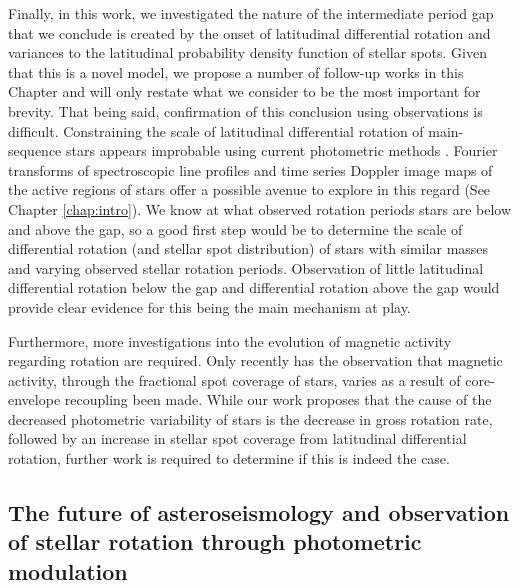 Finally, in this work, we investigated the nature of the intermediate period gap that we conclude is created by the onset of latitudinal differential rotation and variances to the latitudinal probability density function of stellar spots.
Given that this is a novel model, we propose a number of follow-up works in this Chapter and will only restate what we consider to be the most important for brevity.
That being said, confirmation of this conclusion using observations is difficult.
Constraining the scale of latitudinal differential rotation of main-sequence stars appears improbable using current photometric methods \citep[See Section 4.3 of][]{aigrain_hare_2015}.
Fourier transforms of spectroscopic line profiles and time series Doppler image maps of the active regions of stars offer a possible avenue to explore in this regard (See Chapter \ref{chap:intro}).
We know at what observed rotation periods stars are below and above the gap, so a good first step would be to determine the scale of differential rotation (and stellar spot distribution) of stars with similar masses and varying observed stellar rotation periods.
Observation of little latitudinal differential rotation below the gap and differential rotation above the gap would provide clear evidence for this being the main mechanism at play.

Furthermore, more investigations into the evolution of magnetic activity regarding rotation are required.
Only recently has the observation that magnetic activity, through the fractional spot coverage of stars, varies as a result of core-envelope recoupling been made.
While our work proposes that the cause of the decreased photometric variability of stars is the decrease in gross rotation rate, followed by an increase in stellar spot coverage from latitudinal differential rotation, further work is required to determine if this is indeed the case.

\subsection{The future of asteroseismology and observation of stellar rotation through photometric modulation}

